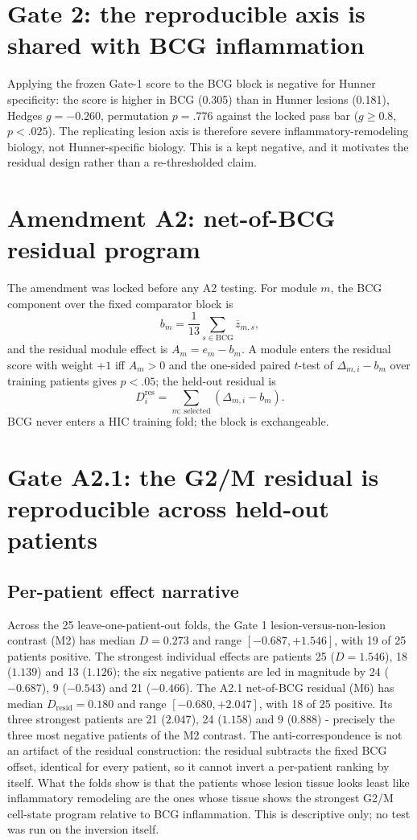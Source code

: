 \documentclass[11pt,a4paper]{article}
\begin{document}
\section{Gate 2: the reproducible axis is shared with BCG inflammation}
Applying the frozen Gate-1 score to the BCG block is negative for Hunner
specificity: the score is higher in BCG (0.305) than in Hunner lesions (0.181),
Hedges $g=-0.260$, permutation $p=.776$ against the locked pass bar
($g\geq0.8$, $p<.025$). The replicating lesion axis is therefore severe
inflammatory-remodeling biology, not Hunner-specific biology. This is a kept
negative, and it motivates the residual design rather than a re-thresholded
claim.

\section{Amendment A2: net-of-BCG residual program}
The amendment was locked before any A2 testing. For module $m$, the BCG
component over the fixed comparator block is
\begin{equation}
b_m=\frac{1}{13}\sum_{s\in\mathrm{BCG}}\overline{z}_{m,s},
\end{equation}
and the residual module effect is $A_m=e_m-b_m$. A module enters the residual
score with weight $+1$ iff $A_m>0$ and the one-sided paired $t$-test of
$\Delta_{m,i}-b_m$ over training patients gives $p<.05$; the held-out residual
is
\begin{equation}
D^{\mathrm{res}}_i=\sum_{m:\,\mathrm{selected}}\left(\Delta_{m,i}-b_m\right).
\end{equation}
BCG never enters a HIC training fold; the block is exchangeable.

\section{Gate A2.1: the G2/M residual is reproducible across held-out patients}

\subsection{Per-patient effect narrative}
Across the 25 leave-one-patient-out folds, the Gate 1 lesion-versus-non-lesion
contrast (M2) has median $D=0.273$ and range $[-0.687,+1.546]$, with 19 of 25
patients positive. The strongest individual effects are patients 25
($D=1.546$), 18 ($1.139$) and 13 ($1.126$); the six negative patients are led
in magnitude by 24 ($-0.687$), 9 ($-0.543$) and 21 ($-0.466$). The A2.1
net-of-BCG residual (M6) has median $D_{\mathrm{resid}}=0.180$ and range
$[-0.680,+2.047]$, with 18 of 25 positive. Its three strongest patients are
21 ($2.047$), 24 ($1.158$) and 9 ($0.888$) - precisely the three most negative
patients of the M2 contrast. The anti-correspondence is not an artifact of the
residual construction: the residual subtracts the fixed BCG offset, identical
for every patient, so it cannot invert a per-patient ranking by itself. What
the folds show is that the patients whose lesion tissue looks least like
inflammatory remodeling are the ones whose tissue shows the strongest G2/M
cell-state program relative to BCG inflammation. This is descriptive only; no
test was run on the inversion itself.
\end{document}
